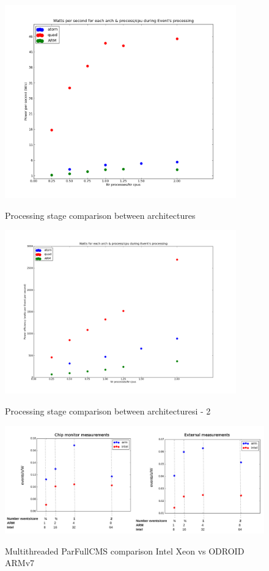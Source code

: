 \begin{figure}[h!]
  \centering
    \includegraphics[width=100mm]{"img/aalto/aalto_all"}
    \label{fig:nf_ss}
    \caption{Processing stage comparison between architectures}
\end{figure}



\begin{figure}[h!]
  \centering
    \includegraphics[width=100mm]{"img/aalto/aalto_all2"}
    \label{fig:nf_ss}
    \caption{Processing stage comparison between architecturesi - 2}
\end{figure}


\begin{figure}[h!]
  \centering
    \includegraphics[width=150mm]{"img/acat/results1"}
    \label{fig:nf_ss}
    \caption{Multithreaded ParFullCMS comparison Intel Xeon vs ODROID ARMv7}
\end{figure}

